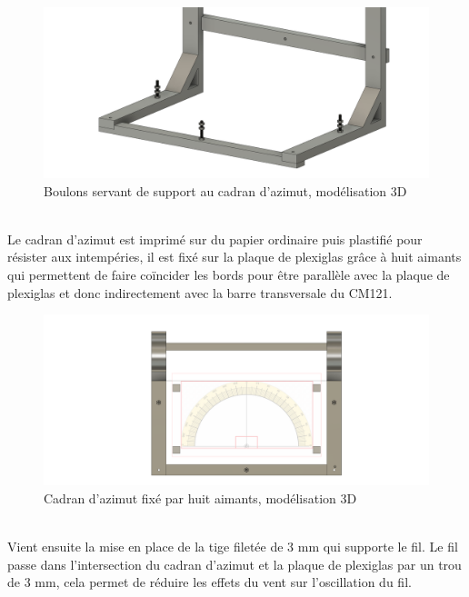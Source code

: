 \documentclass[12pt,a4paper]{article}
\begin{document}
\begin{flushleft}
\begin{figure}[H]
\centering
\includegraphics[width=12cm]{image/montage/boussole_solaire/6.png} 
\caption{Boulons servant de support au cadran d'azimut, modélisation 3D}
\end{figure}
~\\
Le cadran d'azimut est imprimé sur du papier ordinaire puis plastifié pour résister aux intempéries, il est fixé sur la plaque de plexiglas grâce à huit aimants qui permettent de faire coïncider les bords pour être parallèle avec la plaque de plexiglas et donc indirectement avec la barre transversale du CM121.\\

\begin{figure}[H]
\centering
\includegraphics[width=12cm]{image/montage/boussole_solaire/5.png} 
\caption{Cadran d'azimut fixé par huit aimants, modélisation 3D}
\end{figure}

~\\
Vient ensuite la mise en place de la tige filetée de 3 mm qui supporte le fil. Le fil passe dans l'intersection du cadran d'azimut et la plaque de plexiglas par un trou de 3 mm, cela permet de réduire les effets du vent sur l'oscillation du fil.\\


\end{flushleft}
\end{document}
